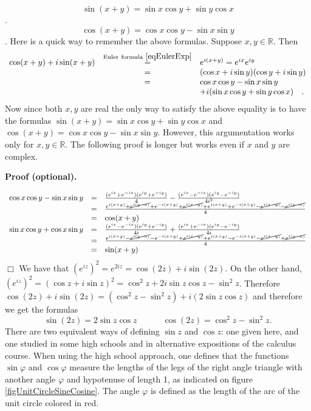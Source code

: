 \documentclass[12pt]{book}
\newenvironment{proofOptional}[1][]{ \textbf{Proof (optional).}}{$\Box$\medskip}
\begin{document}
 \[\sin(x+ y)=\sin x\cos y +\sin y\cos x  \]\quad .
 \[\cos (x+y)= \cos x \cos y - \sin x \sin y\]\quad .
Here is a quick way to remember the above formulas. Suppose $x,y\in \mathbb R$. Then
\[
\begin{array}{rcl}\cos (x+y) + i\sin (x+y)&\stackrel{\mathrm{Euler~formula~}\eqref{eqEulerExp}}{=}& e^{i(x+y)} =e^{ix}e^{iy}\\&=& (\cos x +i \sin y)(\cos y + i \sin y)\\&=& \cos x \cos y - \sin x \sin y\\&& +i(\sin x \cos y+ \sin y \cos x) \quad .\end{array}
\]
Now since both $x,y$ are real the only way to satisfy the above equality is to have the formulas $\sin(x+ y)=\sin x\cos y +\sin y\cos x  $ and $\cos (x+y)=\cos x \cos y - \sin x \sin y$. However, this argumentation works only for $x,y\in \mathbb R$. The following proof is longer but works even if $x$ and $y$ are complex.


\begin{proofOptional}

\[
\begin{array}{rcl}
\cos x \cos y - \sin x \sin y&=& \frac{(e^{ix}+e^{-ix})(e^{iy}+e^{-iy})}4 -\frac{(e^{ix}-e^{-ix})(e^{iy}-e^{-iy}) }{4i^2}\\
&=& \frac{ e^{i(x+y)}+ \cancel{e^{i(y-x)}}+{e^{-i(x+y)}} + \cancel{e^{i(x-y)}} +e^{i(x+y)}+e^{-i(x+y)}- \cancel{e^{i(x-y)}}-\cancel{e^{i(y-x)}} }4\\
&=& \cos(x+y)\\
\sin x \cos y + \cos x \sin y&=& \frac{(e^{ix}-e^{-ix})(e^{iy}+e^{-iy})}{4i} +\frac{(e^{ix}+e^{-ix})(e^{iy}-e^{-iy}) }{4i}\\
&=& \frac{ e^{i(x+y)}- \cancel{e^{i(y-x)}}-{e^{-i(x+y)}} + \cancel{e^{i(x-y)}} +e^{i(x+y)}-e^{-i(x+y)}- \cancel{e^{i(x-y)}}+\cancel{e^{i(y-x)}} }4\\
&=& \sin(x+y)

\end{array}
\]
\end{proofOptional}
We have that $(e^{iz})^2= e^{2iz}= \cos (2z)+ i\sin(2z)$. On the other hand, $(e^{iz})^2 = (\cos z+i\sin z)^2= \cos^2z+2i\sin z\cos z - \sin^2 z$. Therefore $\cos (2z)+ i\sin(2z)= (\cos^2 z- \sin^2 z)+ i(2\sin z\cos z) $ and therefore we get the formulas 
\begin{equation}\label{eqSin2xCos2x}
\sin (2z)=2\sin z \cos z \quad\quad \quad \cos(2z)=\cos^2 z- \sin^2 z.
\end{equation}
There are two equivalent ways of defining $\sin z$ and $\cos z$: one given here, and one studied in some high schools and in alternative expositions of the calculus course. When using the high school approach, one defines that the functions $\sin \varphi$ and $\cos\varphi$ measure the lengths of the legs of the right angle triangle with another angle $\varphi$ and hypotenuse of length 1, as indicated on figure \ref{figUnitCircleSineCosine}. The angle $\varphi$ is defined as the length of the arc of the unit circle colored in red. 
\end{document}
